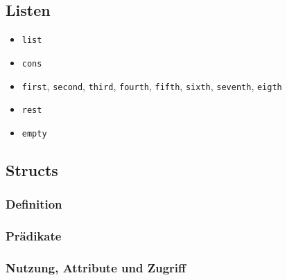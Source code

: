 
\subsection{Listen}
	
	\begin{itemize}
		\item \lstinline[language = Racket]|list|
		\item \lstinline[language = Racket]|cons|
		\item \lstinline[language = Racket]|first|, \lstinline[language = Racket]|second|, \lstinline[language = Racket]|third|, \lstinline[language = Racket]|fourth|, \lstinline[language = Racket]|fifth|, \lstinline[language = Racket]|sixth|, \lstinline[language = Racket]|seventh|, \lstinline[language = Racket]|eigth|
		\item \lstinline[language = Racket]|rest|
		\item \lstinline[language = Racket]|empty|
	\end{itemize}

\subsection{Structs}
	
	\subsubsection{Definition}
	
	\subsubsection{Prädikate}
	
	\subsubsection{Nutzung, Attribute und Zugriff}
